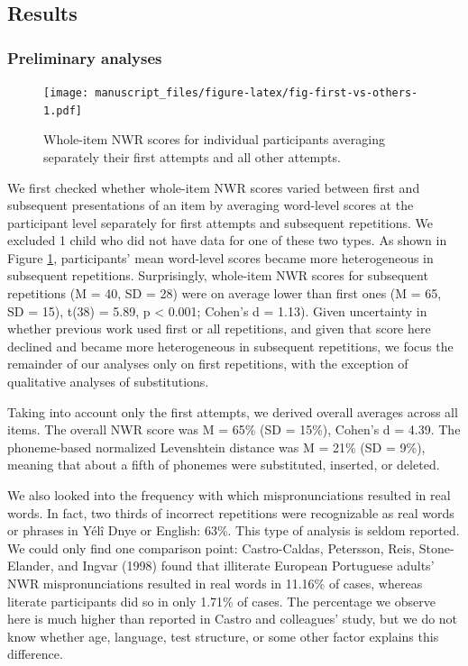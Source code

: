 \documentclass[english,,man,floatsintext]{apa6}
\begin{document}
\hypertarget{results}{%
\subsection{Results}\label{results}}

\hypertarget{preliminary-analyses}{%
\subsubsection{Preliminary analyses}\label{preliminary-analyses}}

\begin{figure}
\centering
\texttt{[image: manuscript\_files/figure-latex/fig-first-vs-others-1.pdf]}
\caption{\label{fig:fig-first-vs-others}Whole-item NWR scores for individual participants averaging separately their first attempts and all other attempts.}
\end{figure}

We first checked whether whole-item NWR scores varied between first and subsequent presentations of an item by averaging word-level scores at the participant level separately for first attempts and subsequent repetitions. We excluded 1 child who did not have data for one of these two types. As shown in Figure \ref{fig:fig-first-vs-others}, participants' mean word-level scores became more heterogeneous in subsequent repetitions. Surprisingly, whole-item NWR scores for subsequent repetitions (M = 40, SD = 28)
were on average lower than first ones (M = 65, SD = 15), t(38) = 5.89, p \textless{} 0.001; Cohen's d = 1.13). Given uncertainty in whether previous work used first or all repetitions, and given that score here declined and became more heterogeneous in subsequent repetitions, we focus the remainder of our analyses only on first repetitions, with the exception of qualitative analyses of substitutions.

Taking into account only the first attempts, we derived overall averages across all items. The overall NWR score was M = 65\% (SD = 15\%), Cohen's d = 4.39. The phoneme-based normalized Levenshtein distance was M = 21\% (SD = 9\%), meaning that about a fifth of phonemes were substituted, inserted, or deleted.

We also looked into the frequency with which mispronunciations resulted in real words. In fact, two thirds of incorrect repetitions were recognizable as real words or phrases in Yélî Dnye or English: 63\%. This type of analysis is seldom reported. We could only find one comparison point: Castro-Caldas, Petersson, Reis, Stone-Elander, and Ingvar (1998) found that illiterate European Portuguese adults' NWR mispronunciations resulted in real words in 11.16\% of cases, whereas literate participants did so in only 1.71\% of cases. The percentage we observe here is much higher than reported in Castro and colleagues' study, but we do not know whether age, language, test structure, or some other factor explains this difference.
\end{document}
